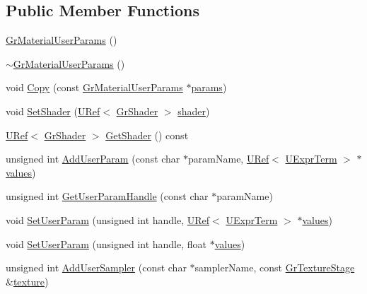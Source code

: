 \subsection*{Public Member Functions}
\begin{CompactItemize}
\item 
\hyperlink{class_gr_material_user_params_421c9f580f17a695f2c576b1639f5036}{GrMaterialUserParams} ()
\item 
\hyperlink{class_gr_material_user_params_365386d0f8e5941409d30cc2d708bf5e}{$\sim$GrMaterialUserParams} ()
\item 
void \hyperlink{class_gr_material_user_params_68f66bcafa7224fbb4e613f5140b2ae5}{Copy} (const \hyperlink{class_gr_material_user_params}{GrMaterialUserParams} $\ast$\hyperlink{glext__bak_8h_580ceb6968724faf709cceb93786912e}{params})
\item 
void \hyperlink{class_gr_material_user_params_bda3aa38ee94e010cf642e3c3c75bff7}{SetShader} (\hyperlink{class_u_ref}{URef}$<$ \hyperlink{class_gr_shader}{GrShader} $>$ \hyperlink{glext_8h_57b2a96adb1d51204909a82d861e395e}{shader})
\item 
\hyperlink{class_u_ref}{URef}$<$ \hyperlink{class_gr_shader}{GrShader} $>$ \hyperlink{class_gr_material_user_params_7a1979f2346b1d3c4d2575c129c85650}{GetShader} () const 
\item 
unsigned int \hyperlink{class_gr_material_user_params_dc63d586a7e83e6f113bf386f60d47d4}{AddUserParam} (const char $\ast$paramName, \hyperlink{class_u_ref}{URef}$<$ \hyperlink{class_u_expr_term}{UExprTerm} $>$ $\ast$\hyperlink{glext__bak_8h_787b90126e660bfa88ef8aa99f74ca41}{values})
\item 
unsigned int \hyperlink{class_gr_material_user_params_29289f87a4720e07e3ad984cd6110600}{GetUserParamHandle} (const char $\ast$paramName)
\item 
void \hyperlink{class_gr_material_user_params_be8eb5892d04d99258233fd049531f23}{SetUserParam} (unsigned int handle, \hyperlink{class_u_ref}{URef}$<$ \hyperlink{class_u_expr_term}{UExprTerm} $>$ $\ast$\hyperlink{glext__bak_8h_787b90126e660bfa88ef8aa99f74ca41}{values})
\item 
void \hyperlink{class_gr_material_user_params_f7ddd09376271494d32494837c58e08c}{SetUserParam} (unsigned int handle, float $\ast$\hyperlink{glext__bak_8h_787b90126e660bfa88ef8aa99f74ca41}{values})
\item 
unsigned int \hyperlink{class_gr_material_user_params_5270ccaad9a2fb6b0a00e6bb1d4a6377}{AddUserSampler} (const char $\ast$samplerName, const \hyperlink{class_gr_texture_stage}{GrTextureStage} \&\hyperlink{glext__bak_8h_8f486379aef534669f4f06f515e7ce6c}{texture})

\end{CompactItemize}
